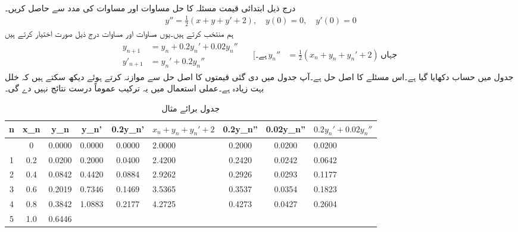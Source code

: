 \quad {}\\
درج ذیل ابتدائی قیمت مسئلہ کا حل مساوات  اور مساوات  کی مدد سے حاصل کریں۔
\begin{align*}
y''=\tfrac{1}{2}(x+y+y'+2),\quad y(0)=0,\quad y'(0)=0
\end{align*}
ہم  منتخب کرتے ہیں۔یوں مساوات  اور مساوات  درج ذیل صورت اختیار کرتے ہیں
\begin{gather*}
\begin{aligned}
y_{n+1}&=y_n+0.2y_n'+0.02y_n''\\
y'_{n+1}&=y_n'+0.2y_n''
\end{aligned}\quad
\begin{aligned}
[\text{ہے۔}\, y_n''&=\tfrac{1}{2}(x_n+y_n+y_n'+2) \, \text{جہاں}\
\end{aligned}
\end{gather*}
جدول  میں حساب دکھایا گیا ہے۔اس مسئلے کا اصل حل  ہے۔آپ جدول میں دی گئی قیمتوں کا اصل حل سے موازنہ کرتے ہوئے  دیکھ سکتے ہیں کہ خلل بہت زیادہ ہے۔عملی استعمال میں یہ ترکیب عموماً  درست نتائج نہیں دے گی۔
\begin{table}
\caption{جدول برائے مثال }
\label{جدول_مثال_اعدادی_دو_درجی_سادہ_الف}
\centering
\begin{otherlanguage}{english}
\begin{tabular}{|C|C|C|C|C|p{15mm}|C|C|p{10mm}|}
\hline
n&x_n&y_n&y_n'&0.2y_n'&$x_n+y_n+y_n'+2$&0.2y_n''&0.02y_n''&$0.2y_n'+0.02y_n''$\\
\hline{}&0&0.0000&0.0000&0.0000&2.0000&0.2000&0.0200&0.0200\\
1&0.2&0.0200&0.2000&0.0400&2.4200&0.2420&0.0242&0.0642\\
2&0.4&0.0842&0.4420&0.0884&2.9262&0.2926&0.0293&0.1177\\
3&0.6&0.2019&0.7346&0.1469&3.5365&0.3537&0.0354&0.1823\\
4&0.8&0.3842&1.0883&0.2177&4.2725&0.4273&0.0427&0.2604\\
5&1.0&0.6446&&&&&&\\
\hline
\end{tabular}
\end{otherlanguage}
\end{table}

